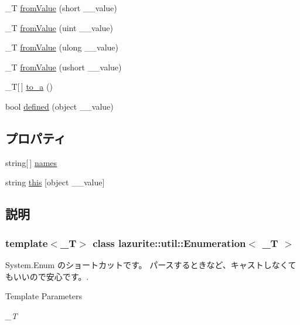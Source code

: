 \begin{DoxyCompactItemize}
\_\-T \hyperlink{classlazurite_1_1util_1_1_enumeration_3_01___t_01_4_a2d3faa336b828f6d2611544a3258a159}{fromValue} (short \_\-\_\-value)
\item 
\_\-T \hyperlink{classlazurite_1_1util_1_1_enumeration_3_01___t_01_4_aff6ca33e481c76dbae9783dd75d7ca8a}{fromValue} (uint \_\-\_\-value)
\item 
\_\-T \hyperlink{classlazurite_1_1util_1_1_enumeration_3_01___t_01_4_a3032515b693fa3804c848efd7fea3cd7}{fromValue} (ulong \_\-\_\-value)
\item 
\_\-T \hyperlink{classlazurite_1_1util_1_1_enumeration_3_01___t_01_4_aca199574ee23eccb13c149864adeb968}{fromValue} (ushort \_\-\_\-value)
\item 
\_\-T\mbox{[}$\,$\mbox{]} \hyperlink{classlazurite_1_1util_1_1_enumeration_3_01___t_01_4_aedf27a303e01ec71c0c56af6e2581bb6}{to\_\-a} ()
\item 
bool \hyperlink{classlazurite_1_1util_1_1_enumeration_3_01___t_01_4_a821e94d7ce737d9549ece28990c79858}{defined} (object \_\-\_\-value)
\end{DoxyCompactItemize}
\subsection*{プロパティ}
\begin{DoxyCompactItemize}
\item 
string\mbox{[}$\,$\mbox{]} \hyperlink{classlazurite_1_1util_1_1_enumeration_3_01___t_01_4_a1070121853e1e0a2dfb1c8202e466a87}{names}
\item 
string \hyperlink{classlazurite_1_1util_1_1_enumeration_3_01___t_01_4_a3821704b716830abfc16bef341196cab}{this} \mbox{[}object \_\-\_\-value\mbox{]}
\end{DoxyCompactItemize}


\subsection{説明}
\subsubsection*{template$<$\_\-T$>$ class lazurite::util::Enumeration$<$ \_\-T $>$}

System.Enum のショートカットです。 パースするときなど、キャストしなくてもいいので安心です。. 
\begin{DoxyTemplParams}{Template Parameters}
\item[{\em \_\-T}]\end{DoxyTemplParams}


